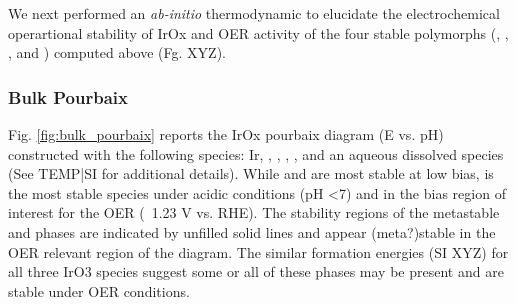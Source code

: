 

We next performed an {\it ab-initio} thermodynamic to elucidate the electrochemical operartional stability of IrOx 
and OER activity of the four stable polymorphs (\rIrOtwo, \aIrOthree, \rIrOthree, and \bIrOthree) computed above (Fg. XYZ).


\subsubsection{Bulk Pourbaix}

Fig. \ref{fig:bulk_pourbaix} reports the IrOx pourbaix diagram (E vs. pH) constructed with the following species: Ir, \rIrOtwo, \aIrOthree,  \rIrOthree, \bIrOthree, and an aqueous dissolved  species (See TEMP|SI for additional details).
%
While \Ir and \rIrOtwo are most stable at low bias, \aIrOthree is the most stable species under acidic conditions (pH \textless 7) and in the bias region of interest for the OER (~1.23 V vs. RHE).
%
%
The stability regions of the metastable \rIrOthree and \bIrOthree phases are indicated by unfilled solid lines and appear (meta?)stable in the OER relevant region of the diagram.
%
The similar formation energies (SI XYZ) for all three IrO3 species suggest some or all of these  phases may be present and are stable under OER conditions.

